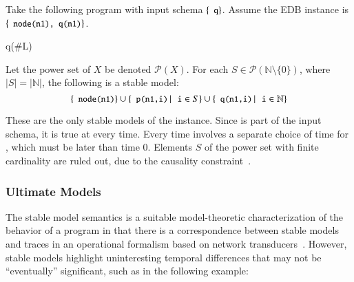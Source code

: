 \begin{example}
\label{ex:infinitemodels}
Take the following \lang program with input schema $\{\dedalus{q}\}$.  Assume the EDB instance is $\{\dedalus{node(n1), q(n1)}\}$.

\begin{Drules}
        {q(#L)}
\end{Drules}

Let the power set of $X$ be denoted $\mathcal{P}(X)$.  For each $S \in \mathcal{P}(\mathbb{N} \setminus \{0\})$, where $|S| = |\mathbb{N}|$, the following is a stable model:
$$\{\dedalus{node(n1)}\} \cup \{\dedalus{p(n1,i)} \, | \, \dedalus{i} \in S \} \cup \{{\dedalus{q(n1,i)} \, | \, \dedalus{i} \in \mathbb{N}}\}$$

These are the only stable models of the instance.  Since  is part of the input schema, it is true at every time.  Every time involves a separate choice of time for , which must be later than time 0.  Elements $S$ of the power set with finite cardinality are ruled out, due to the causality constraint~\cite{ameloot-operational}.
\end{example}


\subsubsection{Ultimate Models}
The stable model semantics is a suitable model-theoretic characterization of the behavior of a program in that there is a correspondence between stable models and traces in an operational formalism based on network transducers~\cite{ameloot-operational}.  However, stable models highlight uninteresting temporal differences that may not be ``eventually'' significant, such as in the following example:

